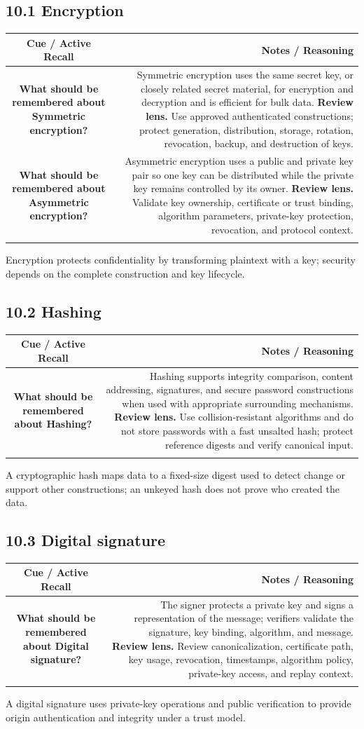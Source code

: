 \documentclass[11pt]{article}
\newcommand{\CornellHeader}{\rowcolor{Navy}\color{white}\bfseries Cue / Active Recall & \color{white}\bfseries Notes / Reasoning \\\endhead}
\newcommand{\CornellRow}[2]{\cellcolor{CueGray}\textbf{#1} & #2 \\\addlinespace[3pt]}
\begin{document}
\subsection{10.1 Encryption}
\begin{longtable}{@{}C N@{}}
\CornellHeader
\CornellRow{What should be remembered about Symmetric encryption?}{Symmetric encryption uses the same secret key, or closely related secret material, for encryption and decryption and is efficient for bulk data. \textbf{Review lens.} Use approved authenticated constructions; protect generation, distribution, storage, rotation, revocation, backup, and destruction of keys.}
\CornellRow{What should be remembered about Asymmetric encryption?}{Asymmetric encryption uses a public and private key pair so one key can be distributed while the private key remains controlled by its owner. \textbf{Review lens.} Validate key ownership, certificate or trust binding, algorithm parameters, private-key protection, revocation, and protocol context.}
\end{longtable}
\begin{sectionsummarybox}
Encryption protects confidentiality by transforming plaintext with a key; security depends on the complete construction and key lifecycle.
\end{sectionsummarybox}
\subsection{10.2 Hashing}
\begin{longtable}{@{}C N@{}}
\CornellHeader
\CornellRow{What should be remembered about Hashing?}{Hashing supports integrity comparison, content addressing, signatures, and secure password constructions when used with appropriate surrounding mechanisms. \textbf{Review lens.} Use collision-resistant algorithms and do not store passwords with a fast unsalted hash; protect reference digests and verify canonical input.}
\end{longtable}
\begin{sectionsummarybox}
A cryptographic hash maps data to a fixed-size digest used to detect change or support other constructions; an unkeyed hash does not prove who created the data.
\end{sectionsummarybox}
\subsection{10.3 Digital signature}
\begin{longtable}{@{}C N@{}}
\CornellHeader
\CornellRow{What should be remembered about Digital signature?}{The signer protects a private key and signs a representation of the message; verifiers validate the signature, key binding, algorithm, and message. \textbf{Review lens.} Review canonicalization, certificate path, key usage, revocation, timestamps, algorithm policy, private-key access, and replay context.}
\end{longtable}
\begin{sectionsummarybox}
A digital signature uses private-key operations and public verification to provide origin authentication and integrity under a trust model.
\end{sectionsummarybox}
\end{document}
